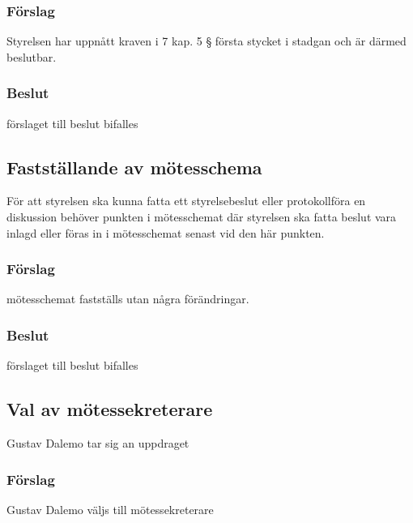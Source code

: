 \documentclass[protokoll]{dvd}
\begin{document}
\subsubsection*{Förslag}

\begin{attsatser}
    \item Styrelsen har uppnått kraven i 7 kap. 5 § första stycket i stadgan och är därmed beslutbar.
\end{attsatser}
\subsubsection*{Beslut}
\begin{attsatser}
    \item förslaget till beslut bifalles
\end{attsatser}


\subsection{Fastställande av mötesschema}

För att styrelsen ska kunna fatta ett styrelsebeslut eller protokollföra en diskussion behöver punkten i mötesschemat där styrelsen ska fatta beslut vara inlagd eller föras in i mötesschemat senast vid den här punkten.

\subsubsection*{Förslag}

\begin{attsatser}
    \item mötesschemat fastställs utan några förändringar.
\end{attsatser}
\subsubsection*{Beslut}
\begin{attsatser}
    \item förslaget till beslut bifalles
\end{attsatser}

\subsection{Val av mötessekreterare}
Gustav Dalemo tar sig an uppdraget
\subsubsection*{Förslag}
\begin{attsatser}
    \item Gustav Dalemo väljs till mötessekreterare
\end{attsatser}
\end{document}
